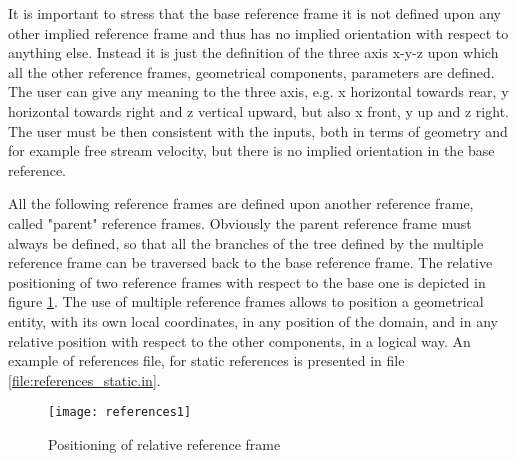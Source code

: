 It is important to stress that the base reference frame it is not 
defined upon any other implied reference frame and thus has no implied 
orientation with respect to anything else. Instead it is just the definition 
of the three axis x-y-z upon which all the other reference frames, geometrical 
components, parameters are defined. The user can give any meaning to the three 
axis, e.g. x horizontal towards rear, y horizontal towards right and z vertical 
upward, but also x front, y up and z right. The user must be then consistent 
with the inputs, both in terms of geometry and for example free stream velocity, 
but there is no implied orientation in the base reference.

All the following reference frames are defined upon another reference frame, 
called "parent" reference frames. Obviously the parent reference frame must 
always be defined, so that all the branches of the tree defined by the multiple 
reference frame can be traversed back to the base reference frame. The relative 
positioning of two reference frames with respect to the base one is depicted in 
figure \ref{fig:references1}. The use of multiple reference frames allows to 
position a geometrical entity, with its own local coordinates, in any position 
of the domain, and in any relative position with respect to the other components, 
in a logical way.  An example of references file, for static references is 
presented in file \ref{file:references_static.in}. 

\begin{figure}
\centering
\texttt{[image: references1]}
\caption{Positioning of relative reference frame}
\label{fig:references1}
\end{figure}

